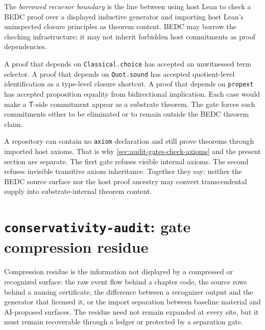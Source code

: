 \begin{definition}
\label{def:audit-gates-borrowed-recursor-boundary}
The \emph{borrowed recursor boundary} is the line between using host Lean to check a BEDC proof over a displayed inductive generator and importing host Lean's uninspected closure principles as theorem content. BEDC may borrow the checking infrastructure; it may not inherit forbidden host commitments as proof dependencies.
\end{definition}

\begin{example}
\label{ex:audit-gates-three-host-leaks}
A proof that depends on \texttt{Classical.choice} has accepted an unwitnessed term selector. A proof that depends on \texttt{Quot.sound} has accepted quotient-level identification as a type-level closure shortcut. A proof that depends on \texttt{propext} has accepted proposition equality from bidirectional implication. Each case would make a $\mathsf{T}$-side commitment appear as a substrate theorem. The gate forces such commitments either to be eliminated or to remain outside the BEDC theorem claim.
\end{example}

\begin{remark}
\label{rem:audit-gates-source-purity-insufficient}
A repository can contain no \texttt{axiom} declaration and still prove theorems through imported host axioms. That is why \autoref{sec:audit-gates-check-axioms} and the present section are separate. The first gate refuses visible internal axioms. The second refuses invisible transitive axiom inheritance. Together they say: neither the BEDC source surface nor the host proof ancestry may convert transcendental supply into substrate-internal theorem content.
\end{remark}

\section{\texttt{conservativity-audit}: gate compression residue}
\label{sec:audit-gates-conservativity-audit}

\begin{definition}
\label{def:audit-gates-compression-residue}
Compression residue is the information not displayed by a compressed or recognized surface: the raw event flow behind a chapter code, the source rows behind a naming certificate, the difference between a recognizer output and the generator that licensed it, or the import separation between baseline material and AI-proposed surfaces. The residue need not remain expanded at every site, but it must remain recoverable through a ledger or protected by a separation gate.
\end{definition}

